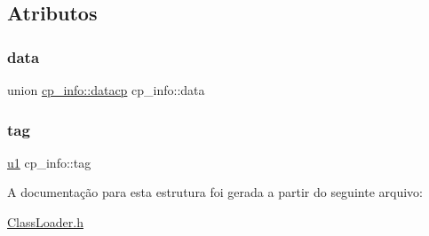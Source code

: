 \subsection{Atributos}
\mbox{\label{structcp__info_a1c63f47410d9a935cfe2ce56075957cb}} 
\subsubsection{\texorpdfstring{data}{data}}
{\footnotesize\ttfamily union \hyperlink{unioncp__info_1_1datacp}{cp\+\_\+info\+::datacp} cp\+\_\+info\+::data}

\mbox{\label{structcp__info_a045b8801a6e96a2a31d3b62ea684f141}} 
\subsubsection{\texorpdfstring{tag}{tag}}
{\footnotesize\ttfamily \hyperlink{ClassLoader_8h_a216a9f8b04b4f0af84a4ca9d1d85a6ca}{u1} cp\+\_\+info\+::tag}



A documentação para esta estrutura foi gerada a partir do seguinte arquivo\+:\begin{DoxyCompactItemize}
\item 
\hyperlink{ClassLoader_8h}{Class\+Loader.\+h}\end{DoxyCompactItemize}
